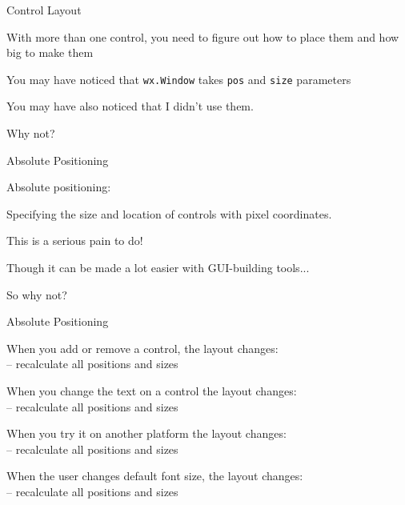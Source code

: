 \documentclass{beamer}
\begin{document}
\begin{frame}[fragile]{Control Layout}

{\Large With more than one control, you need to figure out how to place them 
and how big to make them}

\vfill
{\Large You may have noticed that \verb`wx.Window` takes \verb`pos` and \verb`size` parameters}

\vfill
{\Large You may have also noticed that I didn't use them.}

\vfill
{\Large Why not?}

\end{frame}

\begin{frame}[fragile]{Absolute Positioning}

{\LARGE Absolute positioning:}

\vfill
{\Large Specifying the size and location of controls with pixel coordinates.}

\vfill
{\Large This is a serious pain to do!}

\vfill
{\Large Though it can be made a lot easier with GUI-building tools...}

\vfill
{\Large So why not?}

\end{frame}

\begin{frame}[fragile]{Absolute Positioning}

{\Large When you add or remove a control, the layout changes:}\\
{\large -- recalculate all positions and sizes}

\vfill
{\Large When you change the text  on a control the layout changes:}\\
{\large -- recalculate all positions and sizes}

\vfill
{\Large When you try it on another platform the layout changes:}\\
{\large -- recalculate all positions and sizes}

\vfill
{\Large When the user changes default font size, the layout changes:}\\
{\large -- recalculate all positions and sizes}

\end{frame}
\end{document}
